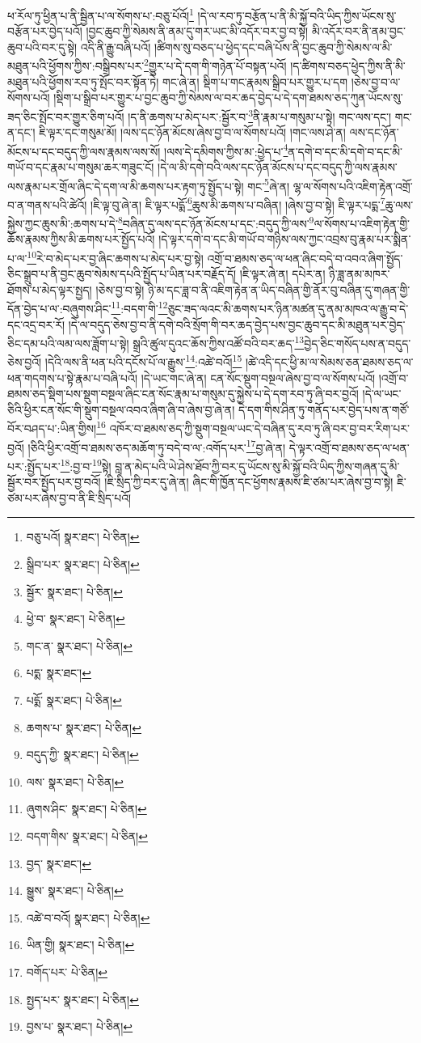 ཕ་རོལ་ཏུ་ཕྱིན་པ་ནི་སྦྱིན་པ་ལ་སོགས་པ་:བཅུ་པོའོ།\footnote{བཅུ་པའོ།  སྣར་ཐང་།  པེ་ཅིན། } །དེ་ལ་རབ་ཏུ་བརྩོན་པ་ནི་མི་སྐྱོ་བའི་ཡིད་ཀྱིས་ཡོངས་སུ་བརྩོན་པར་བྱེད་པའོ། །བྱང་ཆུབ་ཀྱི་སེམས་ནི་ནམ་དུ་གར་ཡང་མི་འདོར་བར་བྱ་བ་སྟེ། མི་འདོར་བར་ནི་ནམ་བྱང་ཆུབ་པའི་བར་དུ་སྟེ། འདི་ནི་རྒྱུ་བཞི་པའོ། །ཚིགས་སུ་བཅད་པ་ཕྱེད་དང་བཞི་པོས་ནི་བྱང་ཆུབ་ཀྱི་སེམས་ལ་མི་མཐུན་པའི་ཕྱོགས་ཀྱིས་:བསྒྲིབས་པར་\footnote{སྒྲིབ་པར་  སྣར་ཐང་།  པེ་ཅིན། }གྱུར་པ་དེ་དག་གི་གཉེན་པོ་བསྟན་པའོ། །ད་ཚིགས་བཅད་ཕྱེད་ཀྱིས་ནི་མི་མཐུན་པའི་ཕྱོགས་རབ་ཏུ་སྤོང་བར་སྟོན་ཏེ། གང་ཞེ་ན། སྡིག་པ་གང་རྣམས་སྒྲིབ་པར་གྱུར་པ་དག །ཅེས་བྱ་བ་ལ་སོགས་པའོ། །སྡིག་པ་སྒྲིབ་པར་གྱུར་པ་བྱང་ཆུབ་ཀྱི་སེམས་ལ་བར་ཆད་བྱེད་པ་དེ་དག་ཐམས་ཅད་ཀུན་ཡོངས་སུ་ཟད་ཅིང་སྤོང་བར་གྱུར་ཅིག་པའོ། །ད་ནི་ཆགས་པ་མེད་པར་:སྦྱོར་བ་\footnote{སྦྱོར་  སྣར་ཐང་།  པེ་ཅིན། }ནི་རྣམ་པ་གསུམ་པ་སྟེ། གང་ལས་དང་། གང་ན་དང་། ཇི་ལྟར་དང་གསུམ་མོ། །ལས་དང་ཉོན་མོངས་ཞེས་བྱ་བ་ལ་སོགས་པའོ། །གང་ལས་ཤེ་ན། ལས་དང་ཉོན་མོངས་པ་དང་བདུད་ཀྱི་ལས་རྣམས་ལས་སོ། །ལས་དེ་དམིགས་ཀྱིས་མ་:ཕྱེད་པ་\footnote{ཕྱེ་བ་  སྣར་ཐང་།  པེ་ཅིན། }ན་དགེ་བ་དང་མི་དགེ་བ་དང་མི་གཡོ་བ་དང་རྣམ་པ་གསུམ་ཆར་གཟུང་ངོ། །དེ་ལ་མི་དགེ་བའི་ལས་དང་ཉོན་མོངས་པ་དང་བདུད་ཀྱི་ལས་རྣམས་ལས་རྣམ་པར་གྲོལ་ཞིང་དེ་དག་ལ་མི་ཆགས་པར་རྟག་ཏུ་སྤྱོད་པ་སྟེ། གང་\footnote{གང་ན་  སྣར་ཐང་།  པེ་ཅིན། }ཞེ་ན། ལྷ་ལ་སོགས་པའི་འཇིག་རྟེན་འགྲོ་བ་ན་གནས་པའི་ཚེའོ། །ཇི་ལྟ་བུ་ཞེ་ན། ཇི་ལྟར་པདྨོ་\footnote{པདྨ་  སྣར་ཐང་། }ཆུས་མི་ཆགས་པ་བཞིན། །ཞེས་བྱ་བ་སྟེ། ཇི་ལྟར་པདྨ་\footnote{པདྨོ་  སྣར་ཐང་།  པེ་ཅིན། }ཆུ་ལས་སྐྱེས་ཀྱང་ཆུས་མི་:ཆགས་པ་དེ་\footnote{ཆགས་པ་  སྣར་ཐང་།  པེ་ཅིན། }བཞིན་དུ་ལས་དང་ཉོན་མོངས་པ་དང་:བདུད་ཀྱི་ལས་\footnote{བདུད་ཀྱི་  སྣར་ཐང་།  པེ་ཅིན། }ལ་སོགས་པ་འཇིག་རྟེན་གྱི་ཆོས་རྣམས་ཀྱིས་མི་ཆགས་པར་སྤྱོད་པའོ། །དེ་ལྟར་དགེ་བ་དང་མི་གཡོ་བ་གཉིས་ལས་ཀྱང་འབྲས་བུ་རྣམ་པར་སྨིན་པ་ལ་\footnote{ལས་  སྣར་ཐང་།  པེ་ཅིན། }རེ་བ་མེད་པར་བྱ་ཞིང་ཆགས་པ་མེད་པར་བྱ་སྟེ། འགྲོ་བ་ཐམས་ཅད་ལ་ཕན་ཞིང་བདེ་བ་འབའ་ཞིག་སྤྱོད་ཅིང་སྒྲུབ་པ་ནི་བྱང་ཆུབ་སེམས་དཔའི་སྤྱོད་པ་ཡིན་པར་བརྗོད་དོ། །ཇི་ལྟར་ཞེ་ན། དཔེར་ན། ཉི་ཟླ་ནམ་མཁར་ཐོགས་པ་མེད་ལྟར་སྤྱད། །ཅེས་བྱ་བ་སྟེ། ཉི་མ་དང་ཟླ་བ་ནི་འཇིག་རྟེན་ན་ཡིད་བཞིན་གྱི་ནོར་བུ་བཞིན་དུ་གཞན་གྱི་དོན་བྱེད་པ་ལ་:བཞུགས་ཤིང་\footnote{ཞུགས་ཤིང་  སྣར་ཐང་།  པེ་ཅིན། }:བདག་གི་\footnote{བདག་གིས་  སྣར་ཐང་།  པེ་ཅིན། }ཅུང་ཟད་ལའང་མི་ཆགས་པར་ཉིན་མཚན་དུ་ནམ་མཁའ་ལ་རྒྱུ་བ་དེ་དང་འདྲ་བར་རོ། །དེ་ལ་བདུད་ཅེས་བྱ་བ་ནི་དགེ་བའི་སྲོག་གི་བར་ཆད་བྱེད་པས་བྱང་ཆུབ་དང་མི་མཐུན་པར་བྱེད་ཅིང་དམ་པའི་ལམ་ལས་ཟློག་པ་སྟེ། སྒྲའི་ཚུལ་དུའང་ཆོས་ཀྱིས་འཚོ་བའི་བར་ཆད་\footnote{བྱད་  སྣར་ཐང་། }བྱེད་ཅིང་གསོད་པས་ན་བདུད་ཅེས་བྱའོ། །དེའི་ལས་ནི་ཕན་པའི་དངོས་པོ་ལ་རྒྱུས་\footnote{སྒྱུས་  སྣར་ཐང་།  པེ་ཅིན། }:འཚེ་བའོ།\footnote{འཚེ་བ་བའོ།  སྣར་ཐང་།  པེ་ཅིན། } །ཚེ་འདི་དང་ཕྱི་མ་ལ་སེམས་ཅན་ཐམས་ཅད་ལ་ཕན་གདགས་པ་སྟེ་རྣམ་པ་བཞི་པའོ། །དེ་ཡང་གང་ཞེ་ན། ངན་སོང་སྡུག་བསྔལ་ཞེས་བྱ་བ་ལ་སོགས་པའོ། །འགྲོ་བ་ཐམས་ཅད་སྡིག་པས་སྡུག་བསྔལ་ཞིང་ངན་སོང་རྣམ་པ་གསུམ་དུ་སྐྱེས་པ་དེ་དག་རབ་ཏུ་ཞི་བར་བྱའོ། །དེ་ལ་ཡང་ཅིའི་ཕྱིར་ངན་སོང་གི་སྡུག་བསྔལ་འབའ་ཞིག་ཞི་བ་ཞེས་བྱ་ཞེ་ན། དེ་དག་གིས་ཤིན་ཏུ་གནོད་པར་བྱེད་པས་ན་གཙོ་བོར་བཤད་པ་:ཡིན་གྱིས།\footnote{ཡིན་གྱི།  སྣར་ཐང་།  པེ་ཅིན། } འཁོར་བ་ཐམས་ཅད་ཀྱི་སྡུག་བསྔལ་ཡང་དེ་བཞིན་དུ་རབ་ཏུ་ཞི་བར་བྱ་བར་རིག་པར་བྱའོ། །ཅིའི་ཕྱིར་འགྲོ་བ་ཐམས་ཅད་མཆོག་ཏུ་བདེ་བ་ལ་:འགོད་པར་\footnote{བགོད་པར་  པེ་ཅིན། }བྱ་ཞེ་ན། དེ་ལྟར་འགྲོ་བ་ཐམས་ཅད་ལ་ཕན་པར་:སྤྱོད་པར་\footnote{སྤྱད་པར་  སྣར་ཐང་།  པེ་ཅིན། }:བྱ་བ་\footnote{བྱས་པ་  སྣར་ཐང་།  པེ་ཅིན། }སྟེ། བླ་ན་མེད་པའི་ཡེ་ཤེས་ཐོབ་ཀྱི་བར་དུ་ཡོངས་སུ་མི་སྐྱོ་བའི་ཡིད་ཀྱིས་གཞན་དུ་མི་སྦྱོར་བར་སྤྱོད་པར་བྱ་བའོ། །ཇི་སྲིད་ཀྱི་བར་དུ་ཞེ་ན། ཞིང་གི་ཁྱོན་དང་ཕྱོགས་རྣམས་ཇི་ཙམ་པར་ཞེས་བྱ་བ་སྟེ། ཇི་ཙམ་པར་ཞེས་བྱ་བ་ནི་ཇི་སྲིད་པའོ། 